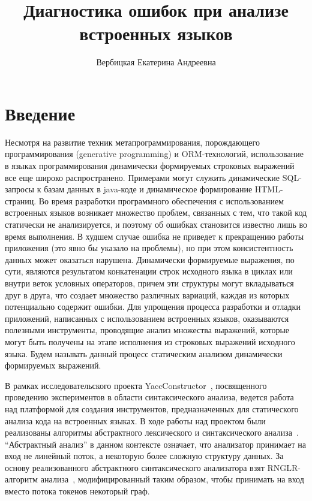 
\title{Диагностика ошибок при анализе встроенных языков}
%

\author{Вербицкая Екатерина Андреевна}
%
%
%

\maketitle              %

\section*{Введение}
Несмотря на развитие техник метапрограммирования, порождающего программирования 
(generative programming) и ORM-технологий, использование в языках программирования 
динамически формируемых строковых выражений все еще широко распространено. 
Примерами могут служить динамические SQL-запросы к базам данных в java-коде и 
динамическое формирование HTML-страниц. Во время разработки программного обеспечения
с использованием встроенных языков возникает множество проблем, связанных с тем, 
что такой код статически не анализируется, и поэтому об ошибках становится 
известно лишь во время выполнения. В худшем случае ошибка не приведет к прекращению 
работы приложения (это явно бы указало на проблемы), но при этом консистентность 
данных может оказаться нарушена. Динамически формируемые выражения, по сути, являются 
результатом конкатенации строк исходного языка в циклах или внутри веток условных 
операторов, причем эти структуры могут вкладываться друг в друга, что создает 
множество различных вариаций, каждая из которых потенциально содержит ошибки. 
Для упрощения процесса разработки и отладки приложений, написанных с использованием 
встроенных языков, оказываются полезными инструменты, проводящие анализ множества 
выражений, которые могут быть получены на этапе исполнения из строковых выражений 
исходного языка. Будем называть данный процесс статическим анализом динамически 
формируемых выражений.

В рамках исследовательского проекта YaccConstructor~\cite{YaccConstructor}, посвященного проведению 
экспериментов в области синтаксического анализа, ведется работа над платформой 
для создания инструментов, предназначенных для статического анализа кода на встроенных
языках. В ходе работы над проектом были реализованы алгоритмы абстрактного 
лексического и синтаксического анализа~\cite{grigorev2013glr}. “Абстрактный анализ” в данном контексте 
означает, что анализатор принимает на вход не линейный поток, а некоторую более 
сложную структуру данных. За основу реализованного абстрактного синтаксического 
анализатора взят RNGLR-алгоритм анализа~\cite{Scott:2006:RNG:1146809.1146810}, модифицированный таким образом, чтобы 
принимать на вход вместо потока токенов некоторый граф.

